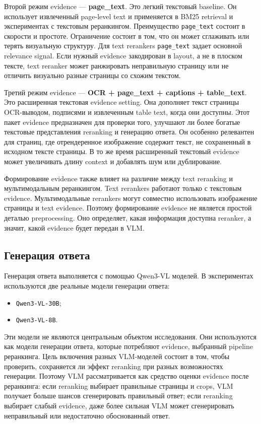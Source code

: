 \documentclass[conference]{IEEEtran}
\begin{document}
Второй режим evidence --- \textbf{page\_text}. Это легкий текстовый baseline. Он использует извлеченный page-level text и применяется в BM25 retrieval и экспериментах с текстовым реранкингом. Преимущество \texttt{page\_text} состоит в скорости и простоте. Ограничение состоит в том, что он может сглаживать или терять визуальную структуру. Для text rerankers \texttt{page\_text} задает основной relevance signal. Если нужный evidence закодирован в layout, а не в плоском тексте, text reranker может ранжировать неправильную страницу или не отличить визуально разные страницы со схожим текстом.

Третий режим evidence --- \textbf{OCR + page\_text + captions + table\_text}. Это расширенная текстовая evidence setting. Она дополняет текст страницы OCR-выводом, подписями и извлеченным table text, когда они доступны. Этот пакет evidence предназначен для проверки того, улучшают ли более богатые текстовые представления reranking и генерацию ответа. Он особенно релевантен для страниц, где отрендеренное изображение содержит текст, не сохраненный в исходном тексте страницы. В то же время расширенный текстовый evidence может увеличивать длину context и добавлять шум или дублирование.

Формирование evidence также влияет на различие между text reranking и мультимодальным реранкингом. Text rerankers работают только с текстовым evidence. Мультимодальные rerankers могут совместно использовать изображение страницы и text evidence. Поэтому формирование evidence не является простой деталью preprocessing. Оно определяет, какая информация доступна reranker, а значит, какой evidence будет передан в VLM.

\subsection{Генерация ответа}

Генерация ответа выполняется с помощью Qwen3-VL моделей. В экспериментах используются две реальные модели генерации ответа:

\begin{itemize}
\item \texttt{Qwen3-VL-30B};
\item \texttt{Qwen3-VL-8B}.
\end{itemize}

Эти модели не являются центральным объектом исследования. Они используются как модели генерации ответа, которые потребляют evidence, выбранный pipeline реранкинга. Цель включения разных VLM-моделей состоит в том, чтобы проверить, сохраняется ли эффект reranking при разных возможностях генерации. Поэтому VLM рассматривается как средство оценки evidence после реранкинга: если reranking выбирает правильные страницы и crops, VLM получает больше шансов сгенерировать правильный ответ; если reranking выбирает слабый evidence, даже более сильная VLM может сгенерировать неправильный или недостаточно обоснованный ответ.
\end{document}
